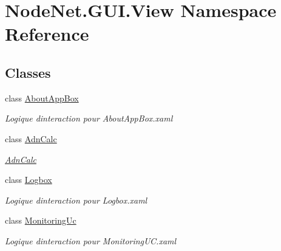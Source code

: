 \hypertarget{namespace_node_net_1_1_g_u_i_1_1_view}{}\section{Node\+Net.\+G\+U\+I.\+View Namespace Reference}
\label{namespace_node_net_1_1_g_u_i_1_1_view}
\subsection*{Classes}
\begin{DoxyCompactItemize}
\item 
class \hyperlink{class_node_net_1_1_g_u_i_1_1_view_1_1_about_app_box}{About\+App\+Box}
\begin{DoxyCompactList}\small\item\em Logique d\textquotesingle{}interaction pour About\+App\+Box.\+xaml \end{DoxyCompactList}\item 
class \hyperlink{class_node_net_1_1_g_u_i_1_1_view_1_1_adn_calc}{Adn\+Calc}
\begin{DoxyCompactList}\small\item\em \hyperlink{class_node_net_1_1_g_u_i_1_1_view_1_1_adn_calc}{Adn\+Calc} \end{DoxyCompactList}\item 
class \hyperlink{class_node_net_1_1_g_u_i_1_1_view_1_1_logbox}{Logbox}
\begin{DoxyCompactList}\small\item\em Logique d\textquotesingle{}interaction pour Logbox.\+xaml \end{DoxyCompactList}\item 
class \hyperlink{class_node_net_1_1_g_u_i_1_1_view_1_1_monitoring_uc}{Monitoring\+Uc}
\begin{DoxyCompactList}\small\item\em Logique d\textquotesingle{}interaction pour Monitoring\+U\+C.\+xaml \end{DoxyCompactList}\end{DoxyCompactItemize}
